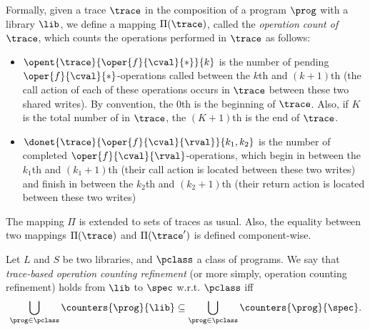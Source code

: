 Formally, given a trace $\trace$ in the composition of a program $\prog$ with a library $\lib$, we define a mapping $\Pi(\trace)$, called the \emph{operation count of $\trace$}, which counts the operations performed in $\trace$ as follows:
\begin{itemize}
	\item $\opent{\trace}{\oper{f}{\cval}{*}}{k}$ is the number of pending $\oper{f}{\cval}{*}$-operations called between the $k$th and $(k+1)$th {\shwrite} (\ie the call action of each of these operations occurs in $\trace$ between these two shared writes). By convention, the $0$th {\shwrite} is the beginning of $\trace$. Also, if $K$ is the total number of {\shwrites} in $\trace$, the $(K+1)$th {\shwrite} is the end of $\trace$.
	\item $\donet{\trace}{\oper{f}{\cval}{\rval}}{k_1,k_2}$ is the number of completed $\oper{f}{\cval}{\rval}$-operations,
	which begin in between the $k_1$th and $(k_1+1)$th {\shwrite} (\ie their call action is located between these two writes) 
	and finish in between the $k_2$th and $(k_2+1)$th {\shwrite} (\ie their return action is located between these two writes)
\end{itemize}

The mapping $\Pi$ is extended to sets of traces as usual. Also, the equality between two mappings $\Pi(\trace)$ and $\Pi(\trace')$ is defined component-wise.



\begin{definition} %
Let $L$ and $S$ be two libraries, %
and $\pclass$ a class of programs.
We say that \emph{trace-based operation counting refinement} (or more simply, operation counting refinement) 
holds from $\lib$ to $\spec$ w.r.t. $\pclass$ iff
\begin{equation}\label{eq:def_count1}
\bigcup_{\prog\in\pclass}\counters{\prog}{\lib}\subseteq \bigcup_{\prog\in\pclass}\counters{\prog}{\spec}.
\end{equation}
\vspace{-2eX}
\end{definition}


